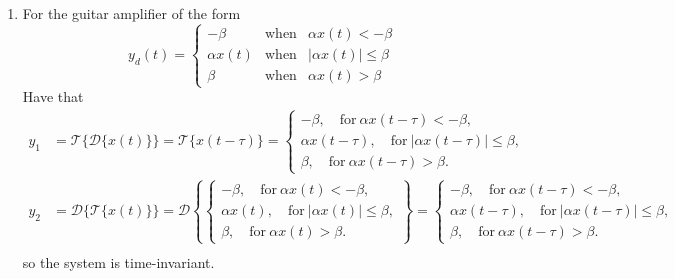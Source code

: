 \begin{enumerate}
\item For the guitar amplifier of the form
\begin{equation*}
y_d(t) = \left\{
  \begin{array}{rcr}
    -\beta & \mathrm{when} & \alpha x(t)<-\beta \\
    \alpha x(t) & \mathrm{when} & |\alpha x(t)| \le \beta \\
    \beta & \mathrm{when} & \alpha x(t)>\beta 
\end{array}
\right.
\end{equation*}
Have that
\begin{align*}
    y_{1}&= \mathcal{T}\{\mathcal{D}\{x(t)\}\}=\mathcal{T}\{x(t-\tau)\}=\begin{cases}
        -\beta, \quad \text{for}\ \alpha x(t-\tau)<-\beta,\\
        \alpha x(t-\tau), \quad \text{for}\ |\alpha x(t-\tau)|\le \beta,\\
        \beta, \quad \text{for}\ \alpha x(t-\tau)>\beta.
    \end{cases} \\
    y_{2}&=\mathcal{D}\{\mathcal{T}\{x(t)\}\}=\mathcal{D}\left\{\begin{cases}
        -\beta, \quad \text{for}\ \alpha x(t)<-\beta,\\
        \alpha x(t), \quad \text{for}\ |\alpha x(t)|\le \beta,\\
        \beta, \quad \text{for}\ \alpha x(t)>\beta.
    \end{cases}\right\}=\begin{cases}
        -\beta, \quad \text{for}\ \alpha x(t-\tau)<-\beta,\\
        \alpha x(t-\tau), \quad \text{for}\ |\alpha x(t-\tau)|\le \beta,\\
        \beta, \quad \text{for}\ \alpha x(t-\tau)>\beta.
    \end{cases} \\ 
\end{align*}
so the system is time-invariant. 


\end{enumerate}
